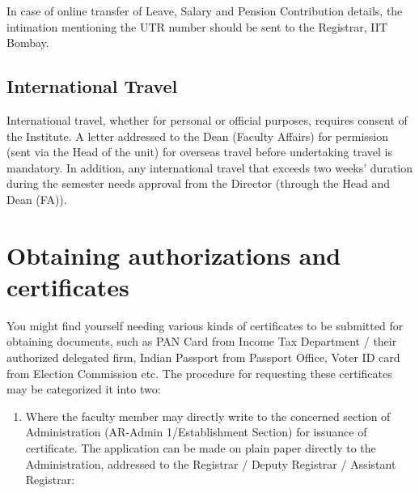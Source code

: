 \documentclass[
  10pt,
  a5paper,
  10pt,
  openany]{amsbook}
\providecommand{\tightlist}{%
  \setlength{\itemsep}{0pt}\setlength{\parskip}{0pt}}
\begin{document}
In case of online transfer of Leave, Salary and Pension Contribution
details, the intimation mentioning the UTR number should be sent to the
Registrar, IIT Bombay.

\section{International Travel}\label{international-travel}

International travel, whether for personal or official purposes,
requires consent of the Institute. A letter addressed to the Dean
(Faculty Affairs) for permission (sent via the Head of the unit) for
overseas travel before undertaking travel is mandatory. In addition, any
international travel that exceeds two weeks' duration during the
semester needs approval from the Director (through the Head and Dean
(FA)).

\chapter{Obtaining authorizations and
certificates}\label{obtaining-authorizations-and-certificates}

You might find yourself needing various kinds of certificates to be
submitted for obtaining documents, such as PAN Card from Income Tax
Department / their authorized delegated firm, Indian Passport from
Passport Office, Voter ID card from Election Commission etc. The
procedure for requesting these certificates may be categorized it into
two:

\begin{enumerate}
\def\labelenumi{\alph{enumi}.}
\tightlist
\item
  Where the faculty member may directly write to the concerned section
  of Administration (AR-Admin 1/Establishment Section) for issuance of
  certificate. The application can be made on plain paper directly to
  the Administration, addressed to the Registrar / Deputy Registrar /
  Assistant Registrar:
\end{enumerate}
\end{document}
